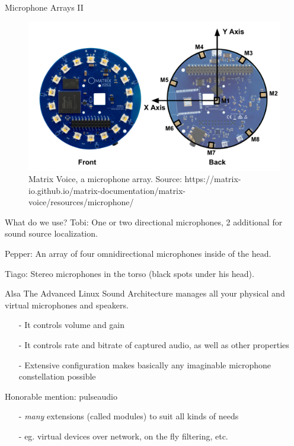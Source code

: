 \documentclass{beamer}
\begin{document}
	\begin{frame}{Microphone Arrays II}
		\begin{figure}[ht]
			\centering
			\includegraphics[width=.8\linewidth]{Bilder/mic_voice_position.png}
			\caption{Matrix Voice, a microphone array. Source: https://matrix-io.github.io/matrix-documentation/matrix-voice/resources/microphone/}
		\end{figure}
	\end{frame}
	
	\begin{frame}{What do we use?}
		Tobi:
		\pause
		One or two directional microphones, 2 additional for sound source localization.
		
		Pepper:
		\pause
		An array of four omnidirectional microphones inside of the head.
		
		Tiago:
		\pause
		Stereo microphones in the torso (black spots under his head).
	\end{frame}
	
	\begin{frame}{Alsa}
		The Advanced Linux Sound Architecture manages all your physical and virtual microphones and speakers.
		\begin{itemize}
			\item[-] It controls volume and gain
			\item[-] It controls rate and bitrate of captured audio, as well as other properties
			\item[-] Extensive configuration makes basically any imaginable microphone constellation possible
		\end{itemize}
		
		\pause
		
		Honorable mention: pulseaudio
		\pause
		\begin{itemize}
			\item[-] \emph{many} extensions (called modules) to suit all kinds of needs
			\item[-] eg. virtual devices over network, on the fly filtering, etc.
		\end{itemize}
	\end{frame}
	
\end{document}
